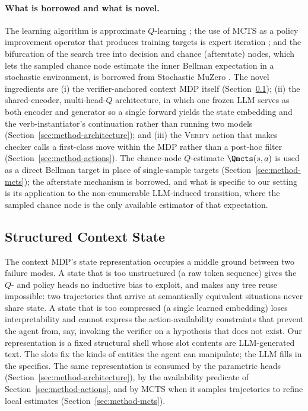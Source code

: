 \paragraph{What is borrowed and what is novel.}
The learning algorithm is approximate $Q$-learning
\citep{mnih2015human, sutton2018reinforcement}; the use of MCTS as a
policy improvement operator that produces training targets is expert
iteration \citep{anthony2017thinking, silver2017alphagozero,
silver2018alphazero}; and the bifurcation of the search tree into
decision and chance (afterstate) nodes, which lets the sampled chance
node estimate the inner Bellman expectation in a stochastic environment,
is borrowed from Stochastic MuZero
\citep{antonoglou2022stochastic}. The novel ingredients are
(i) the verifier-anchored context MDP itself
(Section~\ref{sec:method-state}); (ii) the shared-encoder, multi-head-$Q$
architecture, in which one frozen LLM serves as both encoder and
generator so a single forward yields the state embedding and the
verb-instantiator's continuation rather than running two models
(Section~\ref{sec:method-architecture}); and (iii) the
\textsc{Verify} action that makes checker calls a first-class
move within the MDP rather than a post-hoc filter
(Section~\ref{sec:method-actions}). The chance-node $Q$-estimate
$\Qmcts(s, a)$ is used as a direct Bellman target in place of
single-sample targets (Section~\ref{sec:method-mcts}); the afterstate
mechanism is borrowed, and what is specific to our setting is its
application to the non-enumerable LLM-induced transition, where the
sampled chance node is the only available estimator of that expectation.

\subsection{Structured Context State}
\label{sec:method-state}

The context MDP's state representation occupies a middle ground between
two failure modes. A state that is too unstructured (a raw token
sequence) gives the $Q$- and policy heads no inductive bias to exploit,
and makes any tree reuse impossible: two trajectories that arrive at
semantically equivalent situations never share state. A state that is
too compressed (a single learned embedding) loses interpretability and
cannot express the action-availability constraints that prevent the
agent from, say, invoking the verifier on a hypothesis that does not
exist. Our representation is a fixed structural shell whose slot
contents are LLM-generated text. The slots fix the kinds of entities the
agent can manipulate; the LLM fills in the specifics. The same
representation is consumed by the parametric heads
(Section~\ref{sec:method-architecture}), by the availability predicate
of Section~\ref{sec:method-actions}, and by MCTS when it samples
trajectories to refine local estimates (Section~\ref{sec:method-mcts}).

